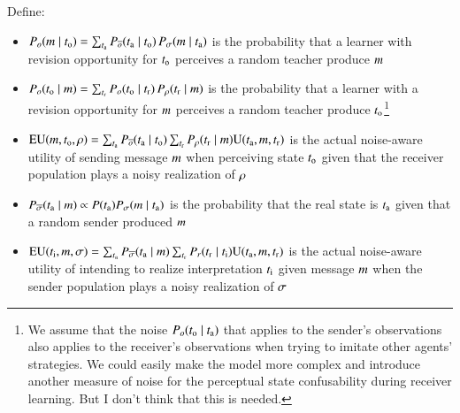 \documentclass[fleqn,reqno,11pt]{article}
\begin{document}
Define:
\begin{itemize}
\item $P_o(m \mid t_{\mathrm{o}}) = \sum_{t_{\mathrm{a}}} P_{\overline{o}}(t_{\mathrm{a}}
  \mid t_{\mathrm{o}}) \thinspace P_{\sigma}(m \mid t_{\mathrm{a}})$ is the probability that
  a learner with revision opportunity for $t_{\mathrm{o}}$ perceives a random teacher produce $m$
\item
  $P_o(t_{\mathrm{o}} \mid m) = \sum_{t_{\mathrm{r}}} P_o(t_{\mathrm{o}} \mid t_{\mathrm{r}})
  \thinspace P_{\rho}(t_{\mathrm{r}} \mid m)$
  is the probability that a learner with a revision opportunity for $m$ perceives a random
  teacher produce $t_{\mathrm{o}}$\footnote{We assume that the noise
    $P_o(t_{\mathrm{o}} \mid t_{\mathrm{a}})$ that applies to the sender's observations also
    applies to the receiver's observations when trying to imitate other agents' strategies. We
    could easily make the model more complex and introduce another measure of noise for the
    perceptual state confusability during receiver learning. But I don't think that this is
    needed.}
\item $\mathrm{EU}(m , t_{\mathrm{o}}, \rho) = \sum_{t_{\mathrm{a}}}  P_{\overline{o}}(t_{\mathrm{a}}
  \mid t_{\mathrm{o}}) \sum_{t_{\mathrm{r}}}  P_{\rho}(t_{\mathrm{r}} \mid
  m) \mathrm{U}(t_{\mathrm{a}}, m, t_{\mathrm{r}})$ is the actual noise-aware utility of
  sending message $m$ when perceiving state $t_{\mathrm{o}}$ given that the receiver
  population plays a noisy realization of $\rho$
\item $P_{\overline{\sigma}}(t_{\mathrm{a}} \mid m) \propto P(t_{\mathrm{a}})
  P_{\sigma}(m \mid t_{\mathrm{a}})$ is the probability that the real state is
  $t_{\mathrm{a}}$ given that a random sender produced $m$
\item $\mathrm{EU}(t_{\mathrm{i}} , m, \sigma) = \sum_{t_{\mathrm{a}}}
  P_{\overline{\sigma}}(t_{\mathrm{a}} \mid m) \sum_{t_{\mathrm{r}}}
  P_{r}(t_{\mathrm{r}} \mid t_{\mathrm{i}})  \mathrm{U}(t_{\mathrm{a}}, m, t_{\mathrm{r}})$ is the actual noise-aware utility of
  intending to realize interpretation $t_{\mathrm{i}}$ given message $m$ when the sender
  population plays a noisy realization of $\sigma$
\end{itemize}
\end{document}
